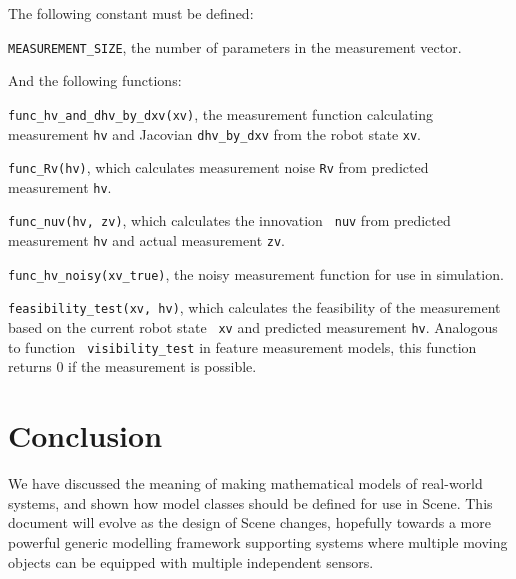 \documentclass{article}
\begin{document}
The following constant must be defined:

\be
\item {\tt MEASUREMENT\_SIZE}, the number of parameters in the
measurement vector.
\ee

And the following functions:

\be
\item {\tt func\_hv\_and\_dhv\_by\_dxv(xv)}, the measurement function
calculating measurement {\tt hv} and Jacovian {\tt dhv\_by\_dxv} from
the robot state {\tt xv}.
\item {\tt func\_Rv(hv)}, which calculates measurement noise {\tt Rv}
from predicted measurement {\tt hv}.
\item {\tt func\_nuv(hv, zv)}, which calculates the innovation {\tt
nuv} from predicted measurement {\tt hv} and actual measurement {\tt zv}.
\item {\tt func\_hv\_noisy(xv\_true)}, the noisy measurement function
for use in simulation.
\item {\tt feasibility\_test(xv, hv)}, which calculates the 
feasibility of the measurement based on the current robot state {\tt
xv} and predicted measurement {\tt hv}. Analogous to function {\tt
visibility\_test} in feature measurement models, this function returns
0 if the measurement is possible.
\ee

\section{Conclusion}

We have discussed the meaning of making mathematical models of
real-world systems, and shown how model classes should be defined for
use in Scene. This document will evolve as the design of Scene
changes, hopefully towards a more powerful generic modelling framework
supporting systems where multiple moving objects can be equipped with
multiple independent sensors.


\end{document}
